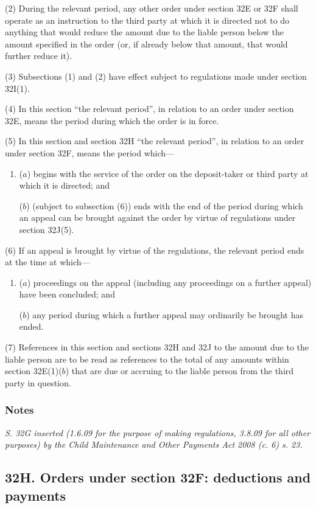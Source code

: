 \documentclass[a4paper]{article}
\newcommand\amendment[1]{\subsubsection*{Notes}{\itshape\frenchspacing\footnotesize #1 \par}}
\begin{document}
(2)
During the relevant period, any other order under section 32E or 32F shall operate as an instruction to the third party at which it is directed not to do anything that would reduce the amount due to the liable person below the amount specified in the order (or, if already below that amount, that would further reduce it).

(3)
Subsections (1) and (2) have effect subject to regulations made under section 32I(1).

(4)
In this section “the relevant period”, in relation to an order under section 32E, means the period during which the order is in force.

(5)
In this section and section 32H “the relevant period”, in relation to an order under section 32F, means the period which---
\begin{enumerate}\item[]
($a$) begins with the service of the order on the deposit-taker or third party at which it is directed; and

($b$) (subject to subsection (6)) ends with the end of the period during which an appeal can be brought against the order by virtue of regulations under section 32J(5).
\end{enumerate}

(6) If an appeal is brought by virtue of the regulations, the relevant period ends at the time at which---
\begin{enumerate}\item[]
($a$) proceedings on the appeal (including any proceedings on a further appeal) have been concluded; and

($b$) any period during which a further appeal may ordinarily be brought has ended.
\end{enumerate}

(7) References in this section and sections 32H and 32J to the amount due to the liable person are to be read as references to the total of any amounts within section 32E(1)($b$) that are due or accruing to the liable person from the third party in question.

\amendment{
S. 32G inserted (1.6.09 for the purpose of making regulations, 3.8.09 for all other purposes) by the Child Maintenance and Other Payments Act 2008 (c. 6)
s. 23.
}

\subsection{32H. Orders under section 32F: deductions and payments}
\end{document}
